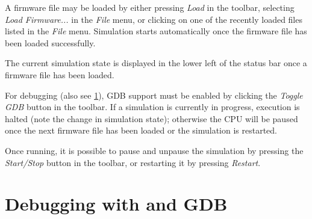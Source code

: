 A firmware file may be loaded by either pressing \emph{Load} in the toolbar,
selecting \emph{Load Firmware...} in the \emph{File} menu, or clicking on one of
the recently loaded files listed in the \emph{File} menu. Simulation starts
automatically once the firmware file has been loaded successfully.

The current simulation state is displayed in the lower left of the status bar
once a firmware file has been loaded.

For debugging (also see \ref{section:debugging}), \ac{GDB} support must be enabled
by clicking the \emph{Toggle \ac{GDB}} button in the toolbar. If a simulation is
currently in progress, execution is halted (note the change in simulation state);
otherwise the \ac{CPU} will be paused once the next firmware file has been loaded
or the simulation is restarted.

Once running, it is possible to pause and unpause the simulation by pressing the
\emph{Start/Stop} button in the toolbar, or restarting it by pressing
\emph{Restart}.

\section{Debugging with \simavr and \ac{GDB}} \label{section:debugging}

